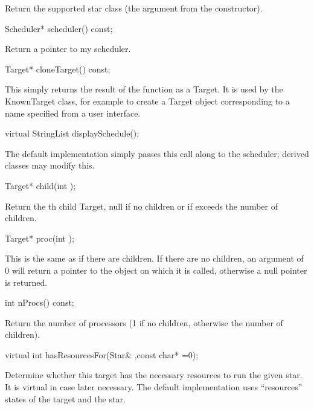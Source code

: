 Return the supported star class (the  argument from
the constructor).

\begin{example}
Scheduler* scheduler() const;
\end{example}

Return a pointer to my scheduler.

\begin{example}
Target* cloneTarget() const;
\end{example}

This simply returns the result of the  function as a Target.
It is used by the KnownTarget class, for example to create a Target
object corresponding to a name specified from a user interface.

\begin{example}
virtual StringList displaySchedule();
\end{example}

The default implementation simply passes this call along to the
scheduler; derived classes may modify this.

\begin{example}
Target* child(int );
\end{example}

Return the th child Target, null if no children or if
 exceeds the number of children.

\begin{example}
Target* proc(int );
\end{example}

This is the same as  if there are children.  If
there are no children, an argument of 0 will return a pointer
to the object on which it is called, otherwise a null pointer
is returned.

\begin{example}
int nProcs() const;
\end{example}

Return the number of processors (1 if no children, otherwise the
number of children).

\begin{example}
virtual int hasResourcesFor(Star& ,const char* =0);
\end{example}

Determine whether this target has the necessary resources to run the
given star.  It is virtual in case later necessary.  The default implementation
uses ``resources'' states of the target and the star.

